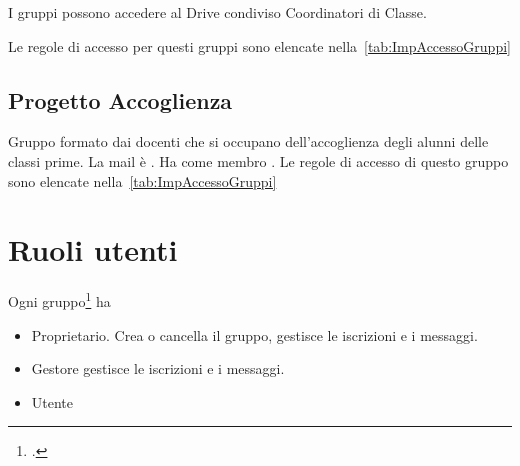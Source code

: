 I gruppi possono accedere al Drive condiviso Coordinatori di Classe.

Le  regole di accesso per questi gruppi sono elencate nella~\cref{tab:ImpAccessoGruppi}
\subsection{Progetto Accoglienza}
Gruppo formato dai docenti che si occupano dell'accoglienza degli alunni delle classi prime. La mail è . Ha come membro .  Le  regole di accesso di questo gruppo sono elencate nella~\cref{tab:ImpAccessoGruppi}
\section{Ruoli utenti}
Ogni gruppo\footcite{Google2023e} ha 
\begin{itemize}
	\item Proprietario. Crea o cancella il gruppo, gestisce le iscrizioni e i messaggi. 
	\item Gestore gestisce le iscrizioni e i messaggi. 
	\item Utente
\end{itemize}
